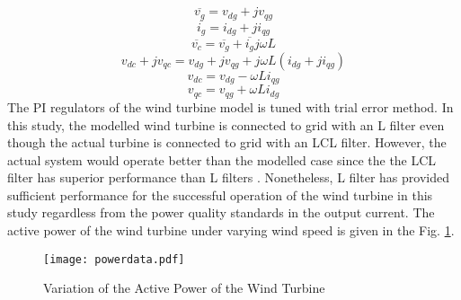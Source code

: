 \begin{equation}
\overline{v_{g}}=v_{dg}+jv_{qg}
\end{equation}
\begin{equation}
\overline{i_{g}}=i_{dg}+ji_{qg}
\end{equation}
\begin{equation}
\overline{v_{c}}=\overline{v_{g}}+\overline{i_{g}}j\omega L
\end{equation}
\begin{equation}
v_{dc}+jv_{qc}=v_{dg}+jv_{qg}+j\omega L (i_{dg}+ji_{qg})
\end{equation}
\begin{equation}
v_{dc}=v_{dg}-\omega L i_{qg}
\label{crosscomp1}
\end{equation}
\begin{equation}
v_{qc}=v_{qg}+\omega L i_{dg}
\label{crosscomp2}
\end{equation}
The PI regulators of the wind turbine model is tuned with trial error method. In this study, the modelled wind turbine is connected to grid with an L filter even though the actual turbine is connected to grid with an LCL filter. However, the actual system would operate better than the modelled case since the the LCL filter has superior performance than L filters \cite{Brantsater2015}. Nonetheless, L filter has provided sufficient performance for the successful operation of the wind turbine in this study regardless from the power quality standards in the output current. The active power of the wind turbine under varying wind speed is given in the Fig. \ref{powerdata}. \par
\begin{figure}[h!]
	\centering
	\texttt{[image: powerdata.pdf]}
	\caption{Variation of the Active Power of the Wind Turbine}
	\label{powerdata}
\end{figure}
